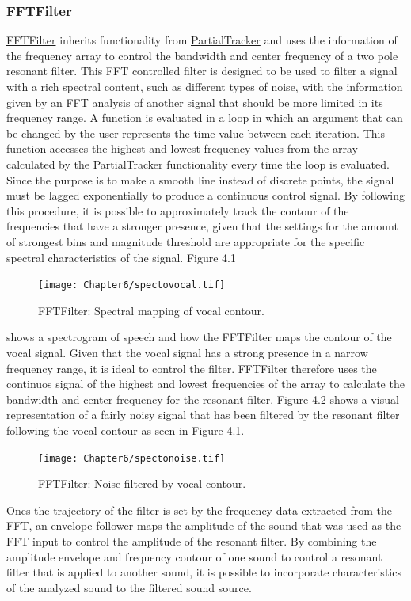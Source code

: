 \subsubsection{FFTFilter}

\href{http://github.com/freuben/FedeLib/blob/master/PartialTracking/PartialTracker.sc}{FFTFilter} inherits functionality from \hyperlink{partrack}{PartialTracker} and uses the information of the frequency array to control the bandwidth and center frequency of a two pole resonant filter. This FFT controlled filter is designed to be used to filter a signal with a rich spectral content, such as different types of noise, with the information given by an FFT analysis of another signal that should be more limited in its frequency range. A function is evaluated in a loop in which an argument that can be changed by the user represents the time value between each iteration. This function accesses the highest and lowest frequency values from the array calculated by the PartialTracker functionality every time the loop is evaluated. Since the purpose is to make a smooth line instead of discrete points, the signal must be lagged exponentially to produce a continuous control signal. By following this procedure, it is possible to approximately track the contour of the frequencies that have a stronger presence, given that the settings for the amount of strongest bins and magnitude threshold are appropriate for the specific spectral characteristics of the signal. Figure 4.1 
\begin{figure}[htbp] %
   \centering
   \texttt{[image: Chapter6/spectovocal.tif]} %
   \caption{FFTFilter: Spectral mapping of vocal contour.}
   \label{fig:example}
\end{figure}
shows a spectrogram of speech and how the FFTFilter maps the contour of the vocal signal. Given that the vocal signal has a strong presence in a narrow frequency range, it is ideal to control the filter. FFTFilter therefore uses the continuos signal of the highest and lowest frequencies of the array to calculate the bandwidth and center frequency for the resonant filter. Figure 4.2 shows a visual representation of a fairly noisy signal that has been filtered by the resonant filter following the vocal contour as seen in Figure 4.1. 
\begin{figure}[htbp] %
   \centering
   \texttt{[image: Chapter6/spectonoise.tif]} %
   \caption{FFTFilter: Noise filtered by vocal contour.}
   \label{fig:example}
\end{figure}
Ones the trajectory of the filter is set by the frequency data extracted from the FFT, an envelope follower maps the amplitude of the sound that was used as the FFT input to control the amplitude of the resonant filter. By combining the amplitude envelope and frequency contour of one sound to control a resonant filter that is applied to another sound, it is possible to incorporate characteristics of the analyzed sound to the filtered sound source.

